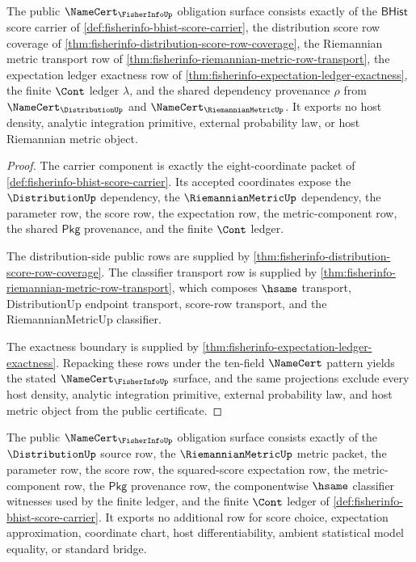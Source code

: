\begin{theorem}
\label{thm:fisherinfo-namecert-obligation-surface}
The public $\NameCert_{\FisherInfoUp}$ obligation surface consists exactly of
the $\mathsf{BHist}$ score carrier of
\autoref{def:fisherinfo-bhist-score-carrier}, the distribution score row
coverage of \autoref{thm:fisherinfo-distribution-score-row-coverage}, the
Riemannian metric transport row of
\autoref{thm:fisherinfo-riemannian-metric-row-transport}, the expectation
ledger exactness row of
\autoref{thm:fisherinfo-expectation-ledger-exactness}, the finite $\Cont$
ledger $\lambda$, and the shared dependency provenance $\rho$ from
$\NameCert_{\DistributionUp}$ and $\NameCert_{\RiemannianMetricUp}$. It
exports no host density, analytic integration primitive, external probability
law, or host Riemannian metric object.
\end{theorem}
\begin{proof}
The carrier component is exactly the eight-coordinate packet of
\autoref{def:fisherinfo-bhist-score-carrier}. Its accepted coordinates expose
the $\DistributionUp$ dependency, the $\RiemannianMetricUp$ dependency, the
parameter row, the score row, the expectation row, the metric-component row,
the shared $\mathsf{Pkg}$ provenance, and the finite $\Cont$ ledger.

The distribution-side public rows are supplied by
\autoref{thm:fisherinfo-distribution-score-row-coverage}. The classifier
transport row is supplied by
\autoref{thm:fisherinfo-riemannian-metric-row-transport}, which composes
$\hsame$ transport, DistributionUp endpoint transport, score-row transport,
and the RiemannianMetricUp classifier.

The exactness boundary is supplied by
\autoref{thm:fisherinfo-expectation-ledger-exactness}. Repacking these rows
under the ten-field $\NameCert$ pattern yields the stated
$\NameCert_{\FisherInfoUp}$ surface, and the same projections exclude every
host density, analytic integration primitive, external probability law, and
host metric object from the public certificate.
\end{proof}

\begin{theorem}
\label{thm:fisherinfo-ledger-exactness-boundary}
The public $\NameCert_{\FisherInfoUp}$ obligation surface consists exactly of
the $\DistributionUp$ source row, the $\RiemannianMetricUp$ metric packet, the
parameter row, the score row, the squared-score expectation row, the
metric-component row, the $\mathsf{Pkg}$ provenance row, the componentwise
$\hsame$ classifier witnesses used by the finite ledger, and the finite
$\Cont$ ledger of \autoref{def:fisherinfo-bhist-score-carrier}. It exports no
additional row for score choice, expectation approximation, coordinate chart,
host differentiability, ambient statistical model equality, or standard
bridge.
\end{theorem}

